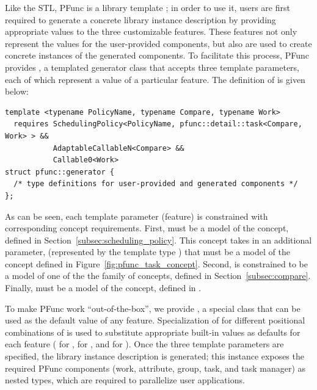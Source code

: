 Like the STL, PFunc is a library template ; in order to use it, users are first
required to generate a concrete library instance description by providing
appropriate values to the three customizable features.
%
These features not only represent the values for the user-provided components,
but also are used to create concrete instances of the generated components. 
%
To facilitate this process, PFunc provides , a templated
generator class that accepts three template parameters, each of which represent
a value of a particular feature.
%
The definition of  is given below:

\begin{lstlisting}[columns=flexible]
template <typename PolicyName, typename Compare, typename Work>
  requires SchedulingPolicy<PolicyName, pfunc::detail::task<Compare, Work> > &&
           AdaptableCallableN<Compare> &&
           Callable0<Work>
struct pfunc::generator { 
  /* type definitions for user-provided and generated components */ 
};
\end{lstlisting}
 
As can be seen, each template parameter (feature) is constrained with
corresponding concept requirements.
%
First,  must be a model of the 
concept, defined in Section~\ref{subsec:scheduling_policy}.
%
This concept takes in an additional parameter,  (represented 
by the template type ) that must be a model of
the  concept defined in
Figure~\ref{fig:pfunc_task_concept}.
%
Second,  is constrained to be a model of one of the the
 family of concepts, defined in
Section~\ref{subsec:compare}.
%
Finally,  must be a model of the  concept,
defined in \ConceptCpp{}.

To make PFunc work ``out-of-the-box'', we provide , a
special class that can be used as the default value of any feature.
%
Specialization of  for different positional combinations
of  is used to substitute appropriate built-in values
as defaults for each feature ( for ,
 for , and
 for ).
%
Once the three template parameters are specified, the library instance
description is generated; this instance exposes the required PFunc components
(work, attribute, group, task, and task manager) as nested types, which are
required to parallelize user applications.

